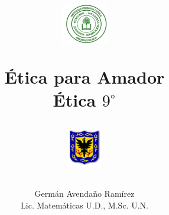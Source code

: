 \documentclass[10pt,addpoints]{exam}
\begin{document}
\title{\begin{minipage}{.2\textwidth}
        \includegraphics[height=1.75cm]{Images/logo-colegio.png}
       \end{minipage}
\begin{minipage}{.55\textwidth}
 \begin{center}
Ética para Amador \\Ética $9^{\circ}$
\end{center}
\end{minipage}
\begin{minipage}{.2\textwidth}
\includegraphics[height=1.75cm]{Images/logo-sed.png} 
\end{minipage}
}
\author{Germ\'{a}n Avendaño Ram\'{i}rez\\Lic. Matemáticas U.D., M.Sc. U.N.}
\date{}
\maketitle
\begin{center}
\end{center}
\vspace{0.1in}
\end{document}
